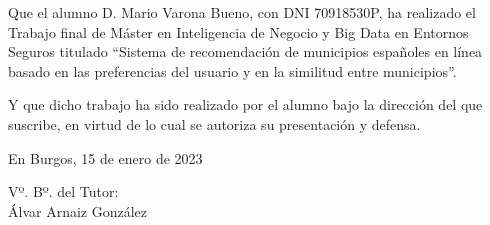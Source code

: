 \documentclass[a4paper,12pt,twoside]{memoir}
\newcommand{\nombre}{Mario Varona Bueno} %
\begin{document}
\noindent Que el alumno D. \nombre, con DNI 70918530P, ha realizado el Trabajo final de Máster en Inteligencia de Negocio y Big Data en Entornos Seguros 
          titulado ``Sistema de recomendación de municipios españoles en línea basado en las preferencias del usuario y en la similitud entre municipios''. 

\noindent Y que dicho trabajo ha sido realizado por el alumno bajo la dirección del que suscribe, en virtud de lo cual se autoriza su presentación y defensa.

\begin{center} %
En Burgos, {\large 15 de enero de 2023}
\end{center}

\vfill\vfill\vfill

% 
% 

\vfill

Vº. Bº. del Tutor:\\[2cm]
Álvar Arnaiz González

\newpage\null\thispagestyle{empty}\newpage

\frontmatter
\end{document}
